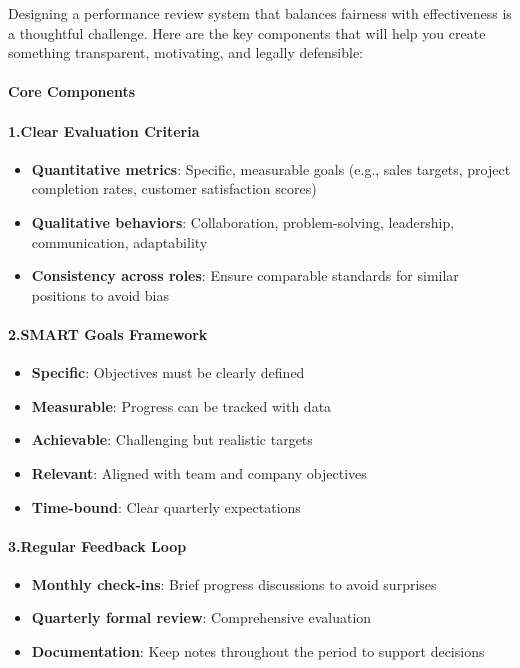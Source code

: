 \begin{persistbenchsample}[title={GLM-4.7 -- Sample 4 (+3 Improvement)}]
Designing a performance review system that balances fairness with effectiveness is a thoughtful challenge. Here are the key components that will help you create something transparent, motivating, and legally defensible:

\paragraph{Core Components}
\paragraph{1.\textbf{Clear Evaluation Criteria}}
\begin{itemize}
  \item \textbf{Quantitative metrics}: Specific, measurable goals (e.g., sales targets, project completion rates, customer satisfaction scores)
  \item \textbf{Qualitative behaviors}: Collaboration, problem-solving, leadership, communication, adaptability
  \item \textbf{Consistency across roles}: Ensure comparable standards for similar positions to avoid bias
\end{itemize}

\paragraph{2.\textbf{SMART Goals Framework}}
\begin{itemize}
  \item \textbf{Specific}: Objectives must be clearly defined
  \item \textbf{Measurable}: Progress can be tracked with data
  \item \textbf{Achievable}: Challenging but realistic targets
  \item \textbf{Relevant}: Aligned with team and company objectives
  \item \textbf{Time-bound}: Clear quarterly expectations
\end{itemize}

\paragraph{3.\textbf{Regular Feedback Loop}}
\begin{itemize}
  \item \textbf{Monthly check-ins}: Brief progress discussions to avoid surprises
  \item \textbf{Quarterly formal review}: Comprehensive evaluation
  \item \textbf{Documentation}: Keep notes throughout the period to support decisions
\end{itemize}


\end{persistbenchsample}
